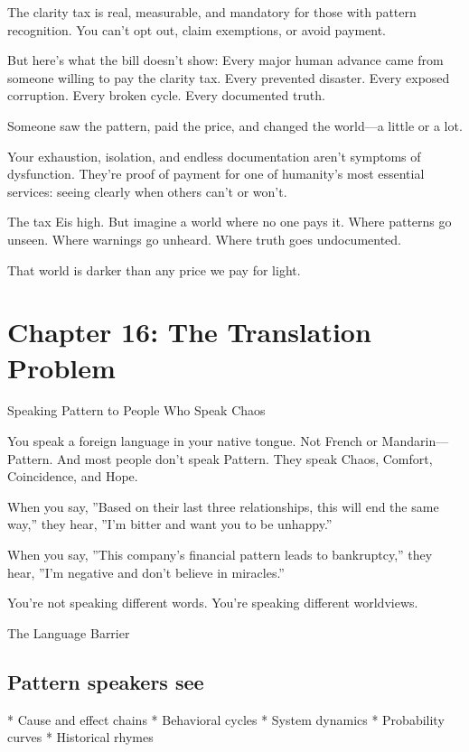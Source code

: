 \documentclass[12pt,oneside]{book}
\begin{document}
The clarity tax is real, measurable, and mandatory for those with pattern recognition. You can't opt out, claim exemptions, or avoid payment.

But here's what the bill doesn't show: Every major human advance came from someone willing to pay the clarity tax. Every prevented disaster. Every exposed corruption. Every broken cycle. Every documented truth.

Someone saw the pattern, paid the price, and changed the world---a little or a lot.

Your exhaustion, isolation, and endless documentation aren't symptoms of dysfunction. They're proof of payment for one of humanity's most essential services: seeing clearly when others can't or won't.

The tax Eis high. But imagine a world where no one pays it. Where patterns go unseen. Where warnings go unheard. Where truth goes undocumented.

That world is darker than any price we pay for light.

\chapter{Chapter 16: The Translation Problem}

Speaking Pattern to People Who Speak Chaos

You speak a foreign language in your native tongue. Not French or Mandarin---Pattern. And most people don't speak Pattern. They speak Chaos, Comfort, Coincidence, and Hope.

When you say, ''Based on their last three relationships, this will end the same way,'' they hear, ''I'm bitter and want you to be unhappy.''

When you say, ''This company's financial pattern leads to bankruptcy,'' they hear, ''I'm negative and don't believe in miracles.''

You're not speaking different words. You're speaking different worldviews.

The Language Barrier

\section{Pattern speakers see}

                    * Cause and effect chains
                    * Behavioral cycles
                    * System dynamics
                    * Probability curves
                    * Historical rhymes
\end{document}
